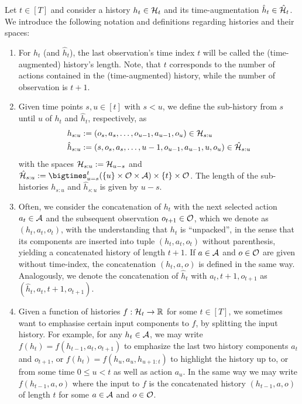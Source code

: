 \documentclass[
    a4paper,
    11pt,
    bibliography=totoc,
    listof=totoc,      
    headinclude=true,
    cleardoublepage=empty,
]{scrbook}
\theoremstyle{plain}
\theoremstyle{definition}
\theoremstyle{remark}
\newcommand{\SetR}{\mathbb R}
\newcommand{\SpaceA}{{\cal A}}
\newcommand{\SpaceO}{{\cal O}}
\newcommand{\SpaceH}{{\cal H}}
\begin{document}
Let $t\in[T]$ and consider a history $h_t\in\SpaceH_t$ and its 
time-augmentation $\hat{h}_t\in\hat\SpaceH_t$. We introduce the following 
notation and definitions regarding histories and their spaces:
\begin{enumerate}
    \item For $h_t$ (and $\hat h_t$), the last observation's time index $t$ 
    will be called the (time-augmented) history's length. Note, that $t$ 
    corresponds to the number of actions contained in the (time-augmented) 
    history, while the number of observation is $t+1$.
    
    \item Given time points $s,u\in[t]$ with $s < u$, we define the 
    sub-history from $s$ until $u$ of $h_t$ and $\hat h_t$, respectively, as
    \begin{align}
        h_{s:u} 
        &:= (o_s, a_s, \dots, o_{u-1}, a_{u-1}, o_u) \in \SpaceH_{s:u} \\
        \hat h_{s:u} 
        &:= (s, o_s, a_s, \dots, u-1, o_{u-1}, a_{u-1}, u, o_u)
            \in \hat \SpaceH_{s:u}
    \end{align}
    with the spaces $\SpaceH_{s:u}:=\SpaceH_{u-s}$ and 
    $\hat \SpaceH_{s:u} := \bigtimes_{u=s}^t
    (\{u\}\times\SpaceO\times\SpaceA)\times\{t\}\times\SpaceO$. The length 
    of the sub-histories $h_{s:u}$ and $\hat h_{s:u}$ is given by $u-s$.

    \item Often, we consider the concatenation of $h_t$ with the next 
    selected action $a_t\in\SpaceA$ and the subsequent observation 
    $o_{t+1}\in\SpaceO$, which we denote as $(h_t,a_t,o_t)$, with the 
    understanding that $h_t$ is ``unpacked'', in the sense that its 
    components are inserted into tuple $(h_t,a_t,o_t)$ without parenthesis, 
    yielding a concatenated history of length $t+1$. If  
    $a\in\SpaceA$ and $o\in\SpaceO$ are given without time-index, the 
    concatenation $(h_t,a,o)$ is defined in the same way. Analogously, we 
    denote the concatenation of $\hat h_t$ with $a_t, t+1, o_{t+1}$ as 
    $(\hat h_t, a_t, t+1, o_{t+1})$.

    \item Given a function of histories $f:\SpaceH_t\to\SetR$ for some
    $t\in[T]$, we sometimes want to emphasise certain input components to $f$, 
    by splitting the input history. For example, for any $h_t\in\SpaceA$, we 
    may write $f(h_t) = f(h_{t-1}, a_t, o_{t+1})$ to emphasize the last two 
    history components $a_t$ and $o_{t+1}$, or $f(h_t) = f(h_u, a_u, 
    h_{u+1:t})$ to highlight the history up to, or from some time $0\leq u <t$ 
    as well as action $a_u$. In the same way we may write $f(h_{t-1}, a, o)$ 
    where the input to $f$ is the concatenated history $(h_{t-1},a,o)$ of 
    length $t$ for some $a\in\SpaceA$ and $o\in\SpaceO$.  


\end{enumerate}
\end{document}
